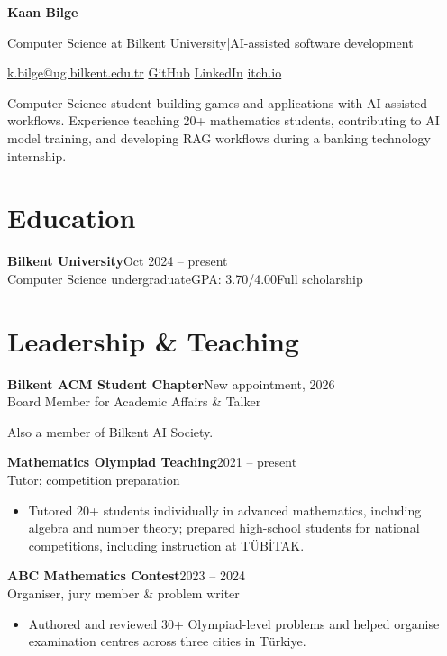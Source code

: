 \documentclass[10pt,a4paper]{article}
\newcommand{\entry}[3]{\par\addvspace{3pt}\textbf{#1}\hfill{\small\color{muted}#3}\\[-1pt]{\small #2}\par}
\begin{document}
\raggedright
\color{ink}
{\fontsize{27}{30}\selectfont\bfseries Kaan Bilge}\par
{\color{accent}Computer Science at Bilkent University\enspace|\enspace AI-assisted software development}\par
\vspace{2pt}
{\small\href{mailto:k.bilge@ug.bilkent.edu.tr}{k.bilge@ug.bilkent.edu.tr}\enspace\textbar\enspace
\href{https://github.com/KaanBilge}{GitHub}\enspace\textbar\enspace
\href{https://www.linkedin.com/in/kaan-bilge}{LinkedIn}\enspace\textbar\enspace
\href{https://kaanbilge.itch.io/}{itch.io}}\par
\vspace{4pt}
Computer Science student building games and applications with AI-assisted workflows. Experience teaching 20+ mathematics students, contributing to AI model training, and developing RAG workflows during a banking technology internship.

\section{Education}
\entry{Bilkent University}{Computer Science undergraduate\enspace\textbar\enspace GPA: 3.70/4.00\enspace\textbar\enspace Full scholarship}{Oct 2024 -- present}

\section{Leadership \& Teaching}
\entry{Bilkent ACM Student Chapter}{Board Member for Academic Affairs \& Talker}{New appointment, 2026}
Also a member of Bilkent AI Society.
\entry{Mathematics Olympiad Teaching}{Tutor; competition preparation}{2021 -- present}
\begin{itemize}
\item Tutored 20+ students individually in advanced mathematics, including algebra and number theory; prepared high-school students for national competitions, including instruction at T\"UB\.{I}TAK.
\end{itemize}
\entry{ABC Mathematics Contest}{Organiser, jury member \& problem writer}{2023 -- 2024}
\begin{itemize}
\item Authored and reviewed 30+ Olympiad-level problems and helped organise examination centres across three cities in T\"urkiye.
\end{itemize}
\end{document}
